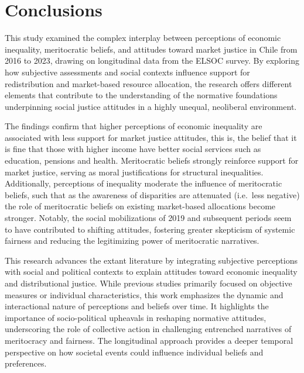 \documentclass[
  12pt,
]{article}
\begin{document}
\section{Conclusions}\label{conclusions}

This study examined the complex interplay between perceptions of
economic inequality, meritocratic beliefs, and attitudes toward market
justice in Chile from 2016 to 2023, drawing on longitudinal data from
the ELSOC survey. By exploring how subjective assessments and social
contexts influence support for redistribution and market-based resource
allocation, the research offers different elements that contribute to
the understanding of the normative foundations underpinning social
justice attitudes in a highly unequal, neoliberal environment.

The findings confirm that higher perceptions of economic inequality are
associated with less support for market justice attitudes, this is, the
belief that it is fine that those with higher income have better social
services such as education, pensions and health. Meritocratic beliefs
strongly reinforce support for market justice, serving as moral
justifications for structural inequalities. Additionally, perceptions of
inequality moderate the influence of meritocratic beliefs, such that as
the awareness of disparities are attenuated (i.e.~less negative) the
role of meritocratic beliefs on existing market-based allocations become
stronger. Notably, the social mobilizations of 2019 and subsequent
periods seem to have contributed to shifting attitudes, fostering
greater skepticism of systemic fairness and reducing the legitimizing
power of meritocratic narratives.

This research advances the extant literature by integrating subjective
perceptions with social and political contexts to explain attitudes
toward economic inequality and distributional justice. While previous
studies primarily focused on objective measures or individual
characteristics, this work emphasizes the dynamic and interactional
nature of perceptions and beliefs over time. It highlights the
importance of socio-political upheavals in reshaping normative
attitudes, underscoring the role of collective action in challenging
entrenched narratives of meritocracy and fairness. The longitudinal
approach provides a deeper temporal perspective on how societal events
could influence individual beliefs and preferences.
\end{document}
